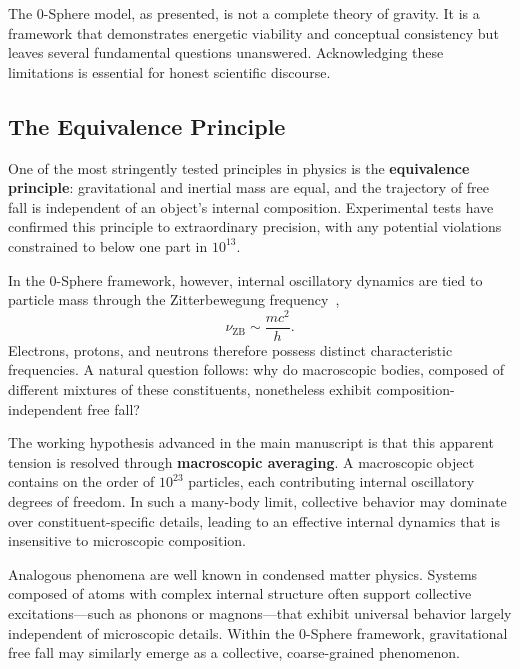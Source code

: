 \documentclass[12pt,letterpaper]{article}
\begin{document}
\justifying

The 0-Sphere model, as presented, is not a complete theory of gravity. It is a framework that demonstrates energetic viability and conceptual consistency but leaves several fundamental questions unanswered. Acknowledging these limitations is essential for honest scientific discourse.


\subsection{The Equivalence Principle}
\label{subsec:equivalence_principle}

One of the most stringently tested principles in physics is the \textbf{equivalence principle}: gravitational and inertial mass are equal, and the trajectory of free fall is independent of an object's internal composition. Experimental tests have confirmed this principle to extraordinary precision, with any potential violations constrained to below one part in $10^{13}$.

In the 0-Sphere framework, however, internal oscillatory dynamics are tied to particle mass through the Zitterbewegung frequency~\cite{Hanamura2026geometrical},
\begin{equation}
\nu_\text{ZB} \sim \frac{m c^2}{h}.
\end{equation}
Electrons, protons, and neutrons therefore possess distinct characteristic frequencies. A natural question follows: why do macroscopic bodies, composed of different mixtures of these constituents, nonetheless exhibit composition-independent free fall?

The working hypothesis advanced in the main manuscript is that this apparent tension is resolved through \textbf{macroscopic averaging}. A macroscopic object contains on the order of $10^{23}$ particles, each contributing internal oscillatory degrees of freedom. In such a many-body limit, collective behavior may dominate over constituent-specific details, leading to an effective internal dynamics that is insensitive to microscopic composition.

Analogous phenomena are well known in condensed matter physics. Systems composed of atoms with complex internal structure often support collective excitations—such as phonons or magnons—that exhibit universal behavior largely independent of microscopic details. Within the 0-Sphere framework, gravitational free fall may similarly emerge as a collective, coarse-grained phenomenon.
\end{document}
